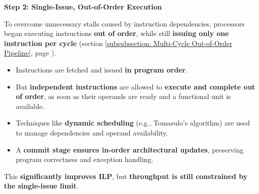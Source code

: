 \highspace
\begin{flushleft}
    \textcolor{Red2}{ \textbf{Step 2: Single-Issue, Out-of-Order Execution}}
\end{flushleft}
To overcome unnecessary stalls caused by instruction dependencies, processors began executing instructions \textbf{out of order}, while still \textbf{issuing only one instruction per cycle} (section \ref{subsubsection: Multi-Cycle Out-of-Order Pipeline}, page \pageref{subsubsection: Multi-Cycle Out-of-Order Pipeline}).
\begin{itemize}
    \item Instructions are fetched and issued \textbf{in program order}.
    \item But \textbf{independent instructions} are allowed to \textbf{execute and complete out of order}, as soon as their operands are ready and a functional unit is available.
    \item Techniques like \textbf{dynamic scheduling} (e.g., Tomasulo's algorithm) are used to manage dependencies and operand availability.
    \item A \textbf{commit stage ensures in-order architectural updates}, preserving program correctness and exception handling.
\end{itemize}
This \textcolor{Green3}{\textbf{significantly improves ILP}}, but \textcolor{Red2}{\textbf{throughput is still constrained by the single-issue limit}}.

\newpage

